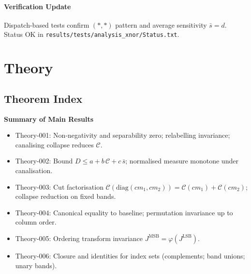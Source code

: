 \documentclass[11pt]{article}
\begin{document}
\paragraph{Verification Update} Dispatch-based tests confirm \((* , *)\) pattern and average sensitivity \(\bar{s}=d\). Status OK in \texttt{results/tests/analysis\_xnor/Status.txt}.

\section{Theory}
\subsection*{Theorem Index}
\textbf{Summary of Main Results}\
\begin{itemize}
 \item Theory‑001: Non‑negativity and separability zero; relabelling invariance; canalising collapse reduces \(\mathcal{C}\).
 \item Theory‑002: Bound \(D \le a + b\,\mathcal{C} + c\,\bar{s}\); normalised measure monotone under canalisation.
 \item Theory‑003: Cut factorisation \(\mathcal{C}(\mathrm{diag}(cm_1,cm_2))=\mathcal{C}(cm_1)+\mathcal{C}(cm_2)\); collapse reduction on fixed bands.
 \item Theory‑004: Canonical equality to baseline; permutation invariance up to column order.
 \item Theory‑005: Ordering transform invariance \(J^{\mathrm{MSB}}=\varphi(J^{\mathrm{LSB}})\).
 \item Theory‑006: Closure and identities for index sets (complements; band unions; unary bands).
\end{itemize}
\end{document}
